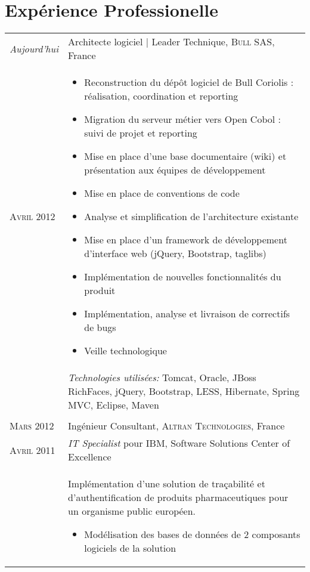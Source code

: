 \section{\texorpdfstring{\color{Blue}Expérience Professionelle}{Expérience Professionelle}}
\begin{longtable}{R{2.5cm}|p{14.8cm}}
  \emph{Aujourd'hui} & Architecte logiciel | Leader Technique, \textsc{Bull SAS}, France\\
  \textsc{Avril 2012} & 
  \vspace{-1em}
  \footnotesize{
    \begin{itemize}
      \item Reconstruction du dépôt logiciel de Bull Coriolis : réalisation, coordination et reporting
      \item Migration du serveur métier vers Open Cobol : suivi de projet et reporting
      \item Mise en place d'une base documentaire (wiki) et présentation aux 
      équipes de développement
      \item Mise en place de conventions de code
      \item Analyse et simplification de l'architecture existante
      \item Mise en place d'un framework de développement d'interface web (jQuery, Bootstrap, taglibs)
      \item Implémentation de nouvelles fonctionnalités du produit
      \item Implémentation, analyse et livraison de correctifs de bugs
      \item Veille technologique
    \end{itemize}
    \vspace{-1em}
  }\\&
 	\footnotesize{\emph{Technologies utilisées:} Tomcat, Oracle, JBoss RichFaces, jQuery, Bootstrap, LESS, Hibernate, Spring MVC, Eclipse, Maven }\\
  \\
 	\textsc{Mars 2012} & Ingénieur Consultant, \textsc{Altran Technologies}, France\\
 	\textsc{Avril 2011}& \emph{IT Specialist} pour IBM, Software Solutions Center of Excellence\\&
 	\footnotesize{
 		Implémentation d'une solution de traçabilité et d'authentification
 	 	de produits pharmaceutiques pour un organisme public européen.
 		\begin{itemize}
			\item Modélisation des bases de données de 2 composants logiciels de la solution

\end{itemize}}
\end{longtable}
